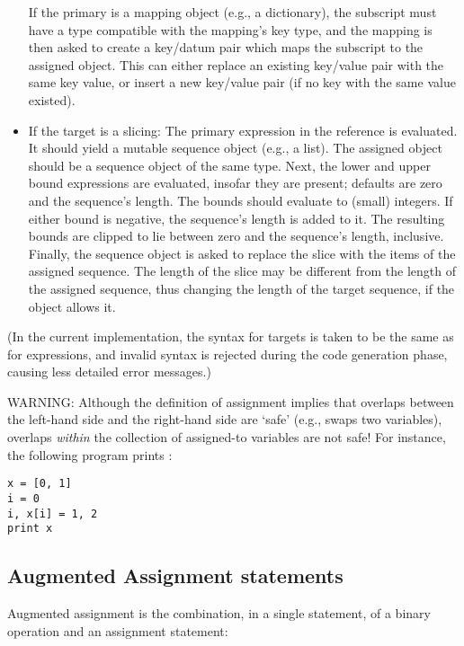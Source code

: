\begin{itemize}
If the primary is a mapping object (e.g., a dictionary), the subscript must
have a type compatible with the mapping's key type, and the mapping is
then asked to create a key/datum pair which maps the subscript to
the assigned object.  This can either replace an existing key/value
pair with the same key value, or insert a new key/value pair (if no
key with the same value existed).

\item
If the target is a slicing: The primary expression in the reference is
evaluated.  It should yield a mutable sequence object (e.g., a list).  The
assigned object should be a sequence object of the same type.  Next,
the lower and upper bound expressions are evaluated, insofar they are
present; defaults are zero and the sequence's length.  The bounds
should evaluate to (small) integers.  If either bound is negative, the
sequence's length is added to it.  The resulting bounds are clipped to
lie between zero and the sequence's length, inclusive.  Finally, the
sequence object is asked to replace the slice with the items of the
assigned sequence.  The length of the slice may be different from the
length of the assigned sequence, thus changing the length of the
target sequence, if the object allows it.

\end{itemize}
        
(In the current implementation, the syntax for targets is taken
to be the same as for expressions, and invalid syntax is rejected
during the code generation phase, causing less detailed error
messages.)

WARNING: Although the definition of assignment implies that overlaps
between the left-hand side and the right-hand side are `safe' (e.g.,
 swaps two variables), overlaps \emph{within} the
collection of assigned-to variables are not safe!  For instance, the
following program prints \samp{[0, 2]}:

\begin{verbatim}
x = [0, 1]
i = 0
i, x[i] = 1, 2
print x
\end{verbatim}


\subsection{Augmented Assignment statements \label{augassign}}

Augmented assignment is the combination, in a single statement, of a binary
operation and an assignment statement:

